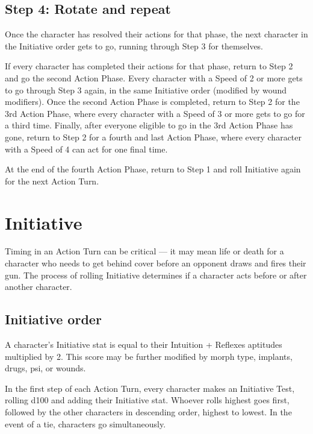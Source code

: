 \subsection{Step 4: Rotate and repeat} \label{sec:rotate-repeat} 

Once the character has resolved their actions for that phase, the next character in the Initiative order gets to go, running through Step 3 for themselves. 

If every character has completed their actions for that phase, return to Step 2 and go the second Action Phase. Every character with a Speed of 2 or more gets to go through Step 3 again, in the same Initiative order (modified by wound modifiers). Once the second Action Phase is completed, return to Step 2 for the 3rd Action Phase, where every character with a Speed of 3 or more gets to go for a third time. Finally, after everyone eligible to go in the 3rd Action Phase has gone, return to Step 2 for a fourth and last Action Phase, where every character with a Speed of 4 can act for one final time. 

At the end of the fourth Action Phase, return to Step 1 and roll Initiative again for the next Action Turn. 



\section{Initiative} \label{sec:initiative} 

Timing in an Action Turn can be critical --- it may mean life or death for a character who needs to get behind cover before an opponent draws and fires their gun. The process of rolling Initiative determines if a character acts before or after another character. 



\subsection{Initiative order} \label{sec:initiative-order} 

A character’s Initiative stat is equal to their Intuition + Reflexes aptitudes multiplied by 2. This score may be further modified by morph type, implants, drugs, psi, or wounds. 

In the first step of each Action Turn, every character makes an Initiative Test, rolling d100 and adding their Initiative stat. Whoever rolls highest goes first, followed by the other characters in descending order, highest to lowest. In the event of a tie, characters go simultaneously. 


